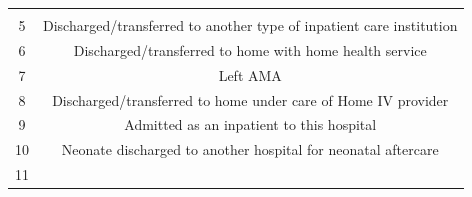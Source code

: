 \documentclass[]{article}
\begin{document}
\begin{itemize}
\begin{longtable}[c]{@{}cc@{}}
\begin{minipage}[t]{0.41\columnwidth}
  \strut\end{minipage}\tabularnewline
  \begin{minipage}[t]{0.35\columnwidth}\centering\strut
  5
  \strut\end{minipage} &
  \begin{minipage}[t]{0.41\columnwidth}\centering\strut
  Discharged/transferred to another type of inpatient care institution
  \strut\end{minipage}\tabularnewline
  \begin{minipage}[t]{0.35\columnwidth}\centering\strut
  6
  \strut\end{minipage} &
  \begin{minipage}[t]{0.41\columnwidth}\centering\strut
  Discharged/transferred to home with home health service
  \strut\end{minipage}\tabularnewline
  \begin{minipage}[t]{0.35\columnwidth}\centering\strut
  7
  \strut\end{minipage} &
  \begin{minipage}[t]{0.41\columnwidth}\centering\strut
  Left AMA
  \strut\end{minipage}\tabularnewline
  \begin{minipage}[t]{0.35\columnwidth}\centering\strut
  8
  \strut\end{minipage} &
  \begin{minipage}[t]{0.41\columnwidth}\centering\strut
  Discharged/transferred to home under care of Home IV provider
  \strut\end{minipage}\tabularnewline
  \begin{minipage}[t]{0.35\columnwidth}\centering\strut
  9
  \strut\end{minipage} &
  \begin{minipage}[t]{0.41\columnwidth}\centering\strut
  Admitted as an inpatient to this hospital
  \strut\end{minipage}\tabularnewline
  \begin{minipage}[t]{0.35\columnwidth}\centering\strut
  10
  \strut\end{minipage} &
  \begin{minipage}[t]{0.41\columnwidth}\centering\strut
  Neonate discharged to another hospital for neonatal aftercare
  \strut\end{minipage}\tabularnewline
  \begin{minipage}[t]{0.35\columnwidth}\centering\strut
  11
  \strut\end{minipage} &
  \begin{minipage}[t]{0.41\columnwidth}\centering\strut

\end{minipage}
\end{longtable}
\end{itemize}
\end{document}
